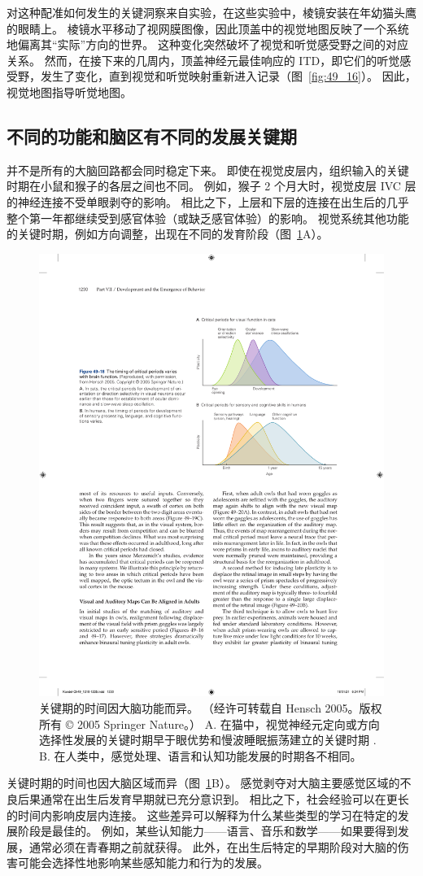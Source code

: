 对这种配准如何发生的关键洞察来自实验，在这些实验中，棱镜安装在年幼猫头鹰的眼睛上。
棱镜水平移动了视网膜图像，因此顶盖中的视觉地图反映了一个系统地偏离其“实际”方向的世界。
这种变化突然破坏了视觉和听觉感受野之间的对应关系。
然而，在接下来的几周内，顶盖神经元最佳响应的 ITD，即它们的听觉感受野，发生了变化，直到视觉和听觉映射重新进入记录（图~\ref{fig:49_16}）。
因此，视觉地图指导听觉地图。



\subsection{不同的功能和脑区有不同的发展关键期}

并不是所有的大脑回路都会同时稳定下来。
即使在视觉皮层内，组织输入的关键时期在小鼠和猴子的各层之间也不同。
例如，猴子 2 个月大时，视觉皮层 IVC 层的神经连接不受单眼剥夺的影响。
相比之下，上层和下层的连接在出生后的几乎整个第一年都继续受到感官体验（或缺乏感官体验）的影响。
视觉系统其他功能的关键时期，例如方向调整，出现在不同的发育阶段（图~\ref{fig:49_18}A）。


\begin{figure}[htbp]
	\centering
	\includegraphics[width=0.6\linewidth]{chap49/fig_49_18}
	\caption{关键期的时间因大脑功能而异。 （经许可转载自 Hensch 2005。版权所有 © 2005 Springer Nature。） A. 在猫中，视觉神经元定向或方向选择性发展的关键时期早于眼优势和慢波睡眠振荡建立的关键时期 . B. 在人类中，感觉处理、语言和认知功能发展的时期各不相同。}
	\label{fig:49_18}
\end{figure}


关键时期的时间也因大脑区域而异（图~\ref{fig:49_18}B）。
感觉剥夺对大脑主要感觉区域的不良后果通常在出生后发育早期就已充分意识到。
相比之下，社会经验可以在更长的时间内影响皮层内连接。
这些差异可以解释为什么某些类型的学习在特定的发展阶段是最佳的。
例如，某些认知能力——语言、音乐和数学——如果要得到发展，通常必须在青春期之前就获得。
此外，在出生后特定的早期阶段对大脑的伤害可能会选择性地影响某些感知能力和行为的发展。



